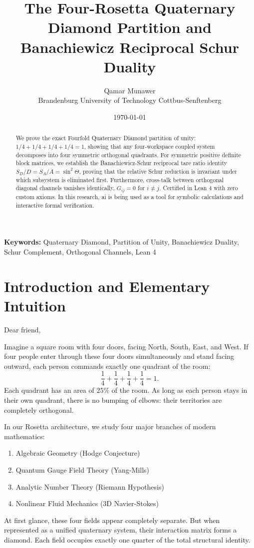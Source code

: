 \documentclass[11pt,a4paper]{article}
\title{\textbf{The Four-Rosetta Quaternary Diamond Partition and Banachiewicz Reciprocal Schur Duality}}
\author{Qamar Munawer \\ Brandenburg University of Technology Cottbus-Senftenberg}
\date{\today}
\theoremstyle{definition}
\begin{document}
\maketitle

\begin{abstract}
We prove the exact Fourfold Quaternary Diamond partition of unity: $1/4 + 1/4 + 1/4 + 1/4 = 1$, showing that any four-workspace coupled system decomposes into four symmetric orthogonal quadrants. For symmetric positive definite block matrices, we establish the Banachiewicz-Schur reciprocal tare ratio identity $S_D / D = S_A / A = \sin^2 \Theta$, proving that the relative Schur reduction is invariant under which subsystem is eliminated first. Furthermore, cross-talk between orthogonal diagonal channels vanishes identically, $G_{ij} = 0$ for $i \neq j$. Certified in Lean 4 with zero custom axioms. In this research, ai is being used as a tool for symbolic calculations and interactive formal verification.
\end{abstract}

\vspace{1em}
\noindent\textbf{Keywords:} Quaternary Diamond, Partition of Unity, Banachiewicz Duality, Schur Complement, Orthogonal Channels, Lean 4

\section{Introduction and Elementary Intuition}

Dear friend,

Imagine a square room with four doors, facing North, South, East, and West. If four people enter through these four doors simultaneously and stand facing outward, each person commands exactly one quadrant of the room:
\begin{equation}
\frac{1}{4} + \frac{1}{4} + \frac{1}{4} + \frac{1}{4} = 1.
\end{equation}
Each quadrant has an area of $25\%$ of the room. As long as each person stays in their own quadrant, there is no bumping of elbows: their territories are completely orthogonal.

In our Rosetta architecture, we study four major branches of modern mathematics:
\begin{enumerate}
    \item Algebraic Geometry (Hodge Conjecture)
    \item Quantum Gauge Field Theory (Yang-Mills)
    \item Analytic Number Theory (Riemann Hypothesis)
    \item Nonlinear Fluid Mechanics (3D Navier-Stokes)
\end{enumerate}
At first glance, these four fields appear completely separate. But when represented as a unified quaternary system, their interaction matrix forms a diamond. Each field occupies exactly one quarter of the total structural identity.
\end{document}
